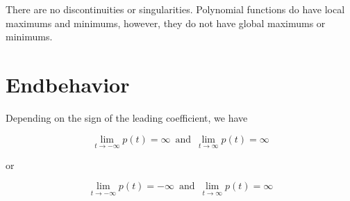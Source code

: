 \documentclass{ximera}
\begin{document}
There are no discontinuities or singularities.  Polynomial functions do have local maximums and minimums, however, they do not have global maximums or minimums.


\section{Endbehavior}



Depending on the sign of the leading coefficient, we have




\[    \lim_{t \to -\infty} p(t) =  \infty  \,   \text{ and }  \,     \lim_{t \to \infty} p(t) = \infty      \]


or 

\[    \lim_{t \to -\infty} p(t) =  -\infty  \,   \text{ and }  \,     \lim_{t \to \infty} p(t) = \infty      \]
\end{document}
